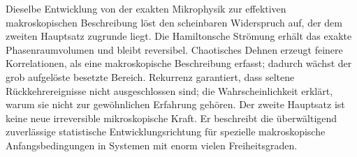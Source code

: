 Dieselbe Entwicklung von der exakten Mikrophysik zur effektiven makroskopischen Beschreibung löst den scheinbaren Widerspruch auf, der dem zweiten Hauptsatz zugrunde liegt. Die Hamiltonsche Strömung erhält das exakte Phasenraumvolumen und bleibt reversibel. Chaotisches Dehnen erzeugt feinere Korrelationen, als eine makroskopische Beschreibung erfasst; dadurch wächst der grob aufgelöste besetzte Bereich. Rekurrenz garantiert, dass seltene Rückkehrereignisse nicht ausgeschlossen sind; die Wahrscheinlichkeit erklärt, warum sie nicht zur gewöhnlichen Erfahrung gehören. Der zweite Hauptsatz ist keine neue irreversible mikroskopische Kraft. Er beschreibt die überwältigend zuverlässige statistische Entwicklungsrichtung für spezielle makroskopische Anfangsbedingungen in Systemen mit enorm vielen Freiheitsgraden.